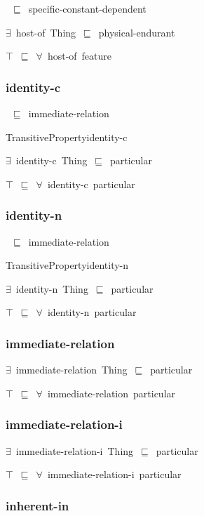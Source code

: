 \documentclass{article}
\begin{document}
~\ensuremath{\sqsubseteq}~specific-constant-dependent

\ensuremath{\exists}~host-of~Thing~\ensuremath{\sqsubseteq}~physical-endurant

\ensuremath{\top}~\ensuremath{\sqsubseteq}~\ensuremath{\forall}~host-of~feature

\subsubsection*{identity-c}

~\ensuremath{\sqsubseteq}~immediate-relation

TransitivePropertyidentity-c

\ensuremath{\exists}~identity-c~Thing~\ensuremath{\sqsubseteq}~particular

\ensuremath{\top}~\ensuremath{\sqsubseteq}~\ensuremath{\forall}~identity-c~particular

\subsubsection*{identity-n}

~\ensuremath{\sqsubseteq}~immediate-relation

TransitivePropertyidentity-n

\ensuremath{\exists}~identity-n~Thing~\ensuremath{\sqsubseteq}~particular

\ensuremath{\top}~\ensuremath{\sqsubseteq}~\ensuremath{\forall}~identity-n~particular

\subsubsection*{immediate-relation}

\ensuremath{\exists}~immediate-relation~Thing~\ensuremath{\sqsubseteq}~particular

\ensuremath{\top}~\ensuremath{\sqsubseteq}~\ensuremath{\forall}~immediate-relation~particular

\subsubsection*{immediate-relation-i}

\ensuremath{\exists}~immediate-relation-i~Thing~\ensuremath{\sqsubseteq}~particular

\ensuremath{\top}~\ensuremath{\sqsubseteq}~\ensuremath{\forall}~immediate-relation-i~particular

\subsubsection*{inherent-in}
\end{document}
